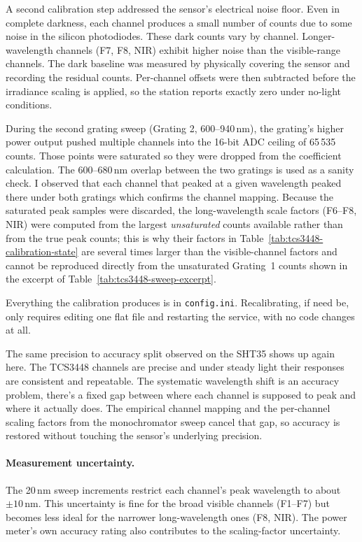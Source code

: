 A second calibration step addressed the sensor's electrical noise floor. Even in complete darkness, each channel produces a small number of counts due to some noise in the silicon photodiodes. These dark counts vary by channel. Longer-wavelength channels (F7, F8, NIR) exhibit higher noise than the visible-range channels. The dark baseline was measured by physically covering the sensor and recording the residual counts. Per-channel offsets were then subtracted before the irradiance scaling is applied, so the station reports exactly zero under no-light conditions.

During the second grating sweep (Grating 2, 600--940\,nm), the grating's higher power output pushed multiple channels into the 16-bit ADC ceiling of 65\,535 counts. Those points were saturated so they were dropped from the coefficient calculation. The 600--680\,nm overlap between the two gratings is used as a sanity check. I observed that each channel that peaked at a given wavelength peaked there under both gratings which confirms the channel mapping. Because the saturated peak samples were discarded, the long-wavelength scale factors (F6--F8, NIR) were computed from the largest \emph{unsaturated} counts available rather than from the true peak counts; this is why their factors in Table~\ref{tab:tcs3448-calibration-state} are several times larger than the visible-channel factors and cannot be reproduced directly from the unsaturated Grating~1 counts shown in the excerpt of Table~\ref{tab:tcs3448-sweep-excerpt}.

Everything the calibration produces is in \texttt{config.ini}. Recalibrating, if need be, only requires editing one flat file and restarting the service, with no code changes at all.

The same precision to accuracy split observed on the SHT35 shows up again here. The TCS3448 channels are precise and under steady light their responses are consistent and repeatable. The systematic wavelength shift is an accuracy problem, there's a fixed gap between where each channel is supposed to peak and where it actually does. The empirical channel mapping and the per-channel scaling factors from the monochromator sweep cancel that gap, so accuracy is restored without touching the sensor's underlying precision.

\paragraph{Measurement uncertainty.}
The 20\,nm sweep increments restrict each channel's peak wavelength to about $\pm10\,$nm. This uncertainty is fine for the broad visible channels (F1--F7) but becomes less ideal for the narrower long-wavelength ones (F8, NIR). The power meter's own accuracy rating also contributes to the scaling-factor uncertainty.

